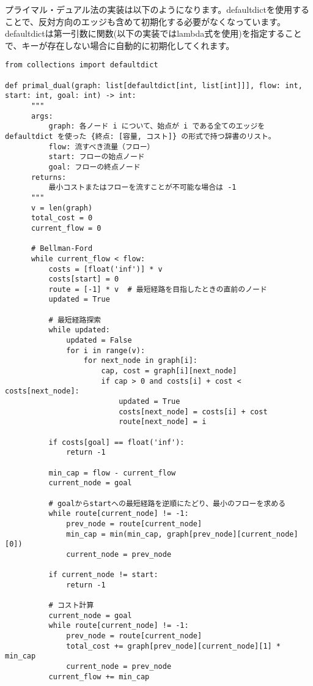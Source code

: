 \newpage

プライマル・デュアル法の実装は以下のようになります。defaultdictを使用することで、反対方向のエッジも含めて初期化する必要がなくなっています。
defaultdictは第一引数に関数(以下の実装ではlambda式を使用)を指定することで、キーが存在しない場合に自動的に初期化してくれます。

\begin{lstlisting}[caption=プライマル・デュアル法の実装, label=primal_dual, frame=TRBL, label={primal_dual}]
from collections import defaultdict

def primal_dual(graph: list[defaultdict[int, list[int]]], flow: int, start: int, goal: int) -> int:
      """
      args:
          graph: 各ノード i について、始点が i である全てのエッジを defaultdict を使った {終点: [容量, コスト]} の形式で持つ辞書のリスト。
          flow: 流すべき流量（フロー）
          start: フローの始点ノード
          goal: フローの終点ノード
      returns:
          最小コストまたはフローを流すことが不可能な場合は -1
      """
      v = len(graph)
      total_cost = 0
      current_flow = 0
  
      # Bellman-Ford 
      while current_flow < flow:
          costs = [float('inf')] * v
          costs[start] = 0
          route = [-1] * v  # 最短経路を目指したときの直前のノード
          updated = True
  
          # 最短経路探索
          while updated:
              updated = False
              for i in range(v):
                  for next_node in graph[i]:
                      cap, cost = graph[i][next_node]
                      if cap > 0 and costs[i] + cost < costs[next_node]:
                          updated = True
                          costs[next_node] = costs[i] + cost
                          route[next_node] = i
  
          if costs[goal] == float('inf'):
              return -1
  
          min_cap = flow - current_flow
          current_node = goal
  
          # goalからstartへの最短経路を逆順にたどり、最小のフローを求める
          while route[current_node] != -1:
              prev_node = route[current_node]
              min_cap = min(min_cap, graph[prev_node][current_node][0])
              current_node = prev_node
          
          if current_node != start:
              return -1
          
          # コスト計算
          current_node = goal
          while route[current_node] != -1:
              prev_node = route[current_node]
              total_cost += graph[prev_node][current_node][1] * min_cap
              current_node = prev_node
          current_flow += min_cap
  

\end{lstlisting}
